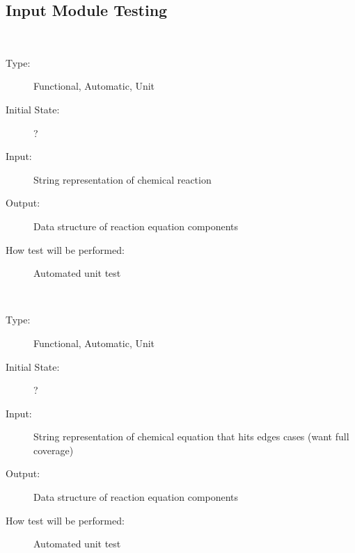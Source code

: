 \documentclass[12pt, titlepage]{article}
\newcounter{testnum} %
\begin{document}
\subsection{Input Module Testing}

\begin{addmargin}[2em]{0em}
\\
\begin{addmargin}[2em]{0em}
\begin{description}
\item[Type:] Functional, Automatic, Unit
					
\item[Initial State:] ?
					
\item[Input:] String representation of chemical reaction
					
\item[Output:] Data structure of reaction equation components
					
\item[How test will be performed:] Automated unit test \\
\end{description}
\end{addmargin}			
\\
\begin{addmargin}[2em]{0em}
\begin{description}
\item[Type:] Functional, Automatic, Unit
					
\item[Initial State:] ?
					
\item[Input:] String representation of chemical equation that hits edges cases 
  (want full coverage)
					
\item[Output:] Data structure of reaction equation components
					
\item[How test will be performed:] Automated unit test\\
\end{description}
\end{addmargin}
\noindent {}\\


\end{addmargin}
\end{document}
